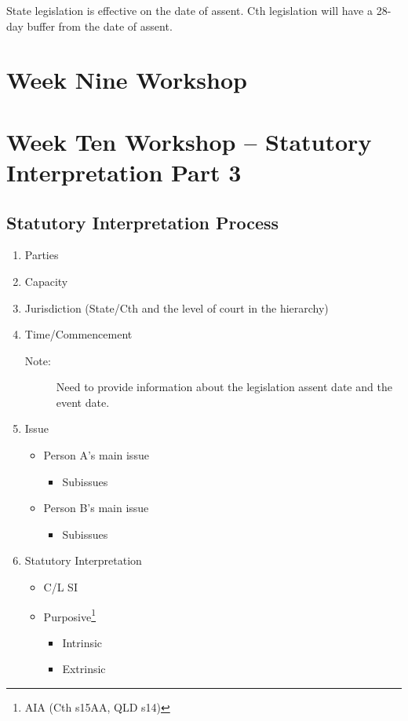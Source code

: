 State legislation is effective on the date of assent. Cth legislation will have a 28-day buffer from the date of assent. 

\section*{Week Nine Workshop}



\section*{Week Ten Workshop -- Statutory Interpretation Part 3}

\subsection*{Statutory Interpretation Process}
\begin{enumerate}
    \item Parties
    \item Capacity
    \item Jurisdiction (State/Cth and the level of court in the hierarchy)
    \item Time/Commencement 
        \begin{description}
            \item[Note:] Need to provide information about the legislation assent date and the event date.  
        \end{description}
    \item Issue
        \begin{itemize}
            \item Person A's main issue
                \begin{itemize}
                    \item Subissues
                \end{itemize}
            \item Person B's main issue
                \begin{itemize}
                    \item Subissues
                \end{itemize}
        \end{itemize}
    \item Statutory Interpretation
        \begin{itemize}
            \item C/L SI
            \item Purposive\footnote{AIA (Cth s15AA, QLD s14)}
                \begin{itemize}
                    \item Intrinsic
                    \item Extrinsic
                \end{itemize}
        \end{itemize}
\end{enumerate}

